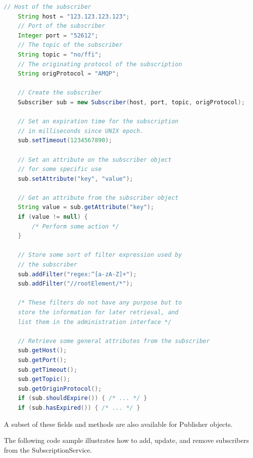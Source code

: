 \begin{lstlisting}[language=Java, captionpos=b, caption=Properties of the Subscriber object, frame=bt, showstringspaces=false]
    // Host of the subscriber
    String host = "123.123.123.123";
    // Port of the subscriber
    Integer port = "52612";
    // The topic of the subscriber
    String topic = "no/ffi";
    // The originating protocol of the subscription
    String origProtocol = "AMQP";
    
    // Create the subscriber
    Subscriber sub = new Subscriber(host, port, topic, origProtocol);
    
    // Set an expiration time for the subscription
    // in milliseconds since UNIX epoch.
    sub.setTimeout(1234567890);
    
    // Set an attribute on the subscriber object
    // for some specific use
    sub.setAttribute("key", "value");
    
    // Get an attribute from the subscriber object
    String value = sub.getAttribute("key");
    if (value != null) {
        /* Perform some action */
    }
    
    // Store some sort of filter expression used by
    // the subscriber
    sub.addFilter("regex:^[a-zA-Z]+");
    sub.addFilter("//rootElement/*");
    
    /* These filters do not have any purpose but to 
    store the information for later retrieval, and
    list them in the administration interface */
    
    // Retrieve some general attributes from the subscriber
    sub.getHost();
    sub.getPort();
    sub.getTimeout();
    sub.getTopic();
    sub.getOriginProtocol();
    if (sub.shouldExpire()) { /* ... */ }
    if (sub.hasExpired()) { /* ... */ }
\end{lstlisting}

A subset of these fields and methods are also available for Publisher objects.

The following code sample illustrates how to add, update, and remove subscribers from the SubscriptionService.

